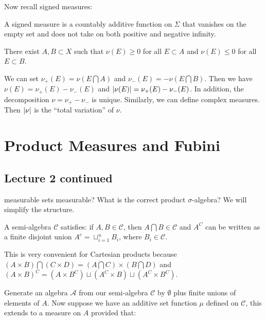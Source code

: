 \documentclass[10pt, twoside]{article}
\begin{document}
    Now recall signed measures: \begin{defn} A signed measure
    is a countably additive function on $\Sigma$ that vanishes on the empty set
and does not take on both positive and negative infinity.  \end{defn}

    \begin{lem} There exist $A,B \subset X$ such that $\nu(E) \geq 0$ for all
    $E \subset A$ and $\nu(E) \leq 0$ for all $E \subset B$.  \end{lem}

    We can set $\nu_+(E) = \nu(E \bigcap A)$ and $\nu_-(E) = -\nu(E \bigcap
    B)$. Then we have $\nu(E) = \nu_+(E) - \nu_-(E)$ and $\lvert\nu(E)\rvert =
    \nu_+(E) - \nu_-(E)$. In addition, the decomposition $\nu = \nu_+ - \nu_-$
    is unique. Similarly, we can define complex measures. Then $\lvert\nu\rvert$ is
    the ``total variation'' of $\nu$.

    \section{Product Measures and Fubini}%
    
    \subsection{Lecture 2 continued}%
    measurable sets measurable? What is the correct product $\sigma$-algebra?
    We will simplify the structure.

    \begin{defn} A semi-algebra $\mathcal{C}$ satisfies: if $A,B
        \in \mathcal{C}$, then $A \bigcap B \in \mathcal{C}$ and $A^C$ can be
        written as a finite disjoint union $A^c = \sqcup_{i=1}^n B_i$, where
        $B_i \in \mathcal{C}$.  \end{defn}
    
    This is very convenient for Cartesian products because $( A \times B )
    \bigcap (C \times D) = (A \bigcap C) \times (B \bigcap D) $ and $(A \times
    B)^C = (A \times B^C) \sqcup (A^C \times B) \sqcup (A^C \times B^C)$.

    Generate an algebra $\mathcal{A}$ from our semi-algebra $\mathcal{C}$ by
    $\emptyset$ plus finite unions of elements of $A$. Now suppose we have an
    additive set function $\mu$ defined on $\mathcal{C}$, this extends to a
    measure on $A$ provided that:
\end{document}
